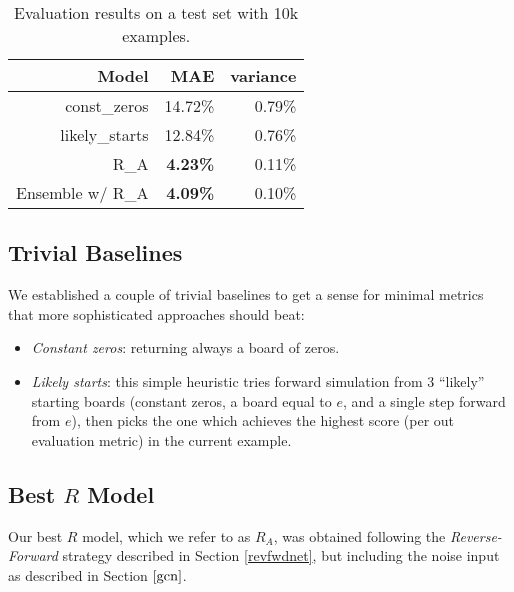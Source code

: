 \documentclass[conference]{IEEEtran}
\begin{document}
\begin{table*}
    \centering
    \caption{Evaluation results on a test set with 10k examples.}
    \label{tab:eval_results}

\begin{tabular}{rrr}
\hline
     Model & MAE & variance \\
\hline
 const\_zeros    & 14.72\%          & 0.79\% \\
 likely\_starts  & 12.84\%          & 0.76\%     \\
 R\_A              & \textbf{4.23\%}           & 0.11\% \\
 \hline
 Ensemble w/ R\_A & \textbf{4.09\%}           & 0.10\%  \\
\hline
\end{tabular}

\end{table*}

\subsection{Trivial Baselines}
We established a couple of trivial baselines to get a sense for minimal metrics that more sophisticated approaches should beat:
\begin{itemize}
    \item {\it Constant zeros}: returning always a board of zeros.
    \item {\it Likely starts}: this simple heuristic tries forward simulation from 3 ``likely'' starting boards (constant zeros, a board equal to $e$, and a single step forward from $e$), then picks the one which achieves the highest score (per out evaluation metric) in the current example.
\end{itemize}

\subsection{Best $R$ Model}
Our best $R$ model, which we refer to as $R_A$, was obtained following the \emph{Reverse-Forward} strategy described in Section \ref{revfwdnet}, but including the noise input as described in Section $\ref{gcn}$. 
\end{document}
